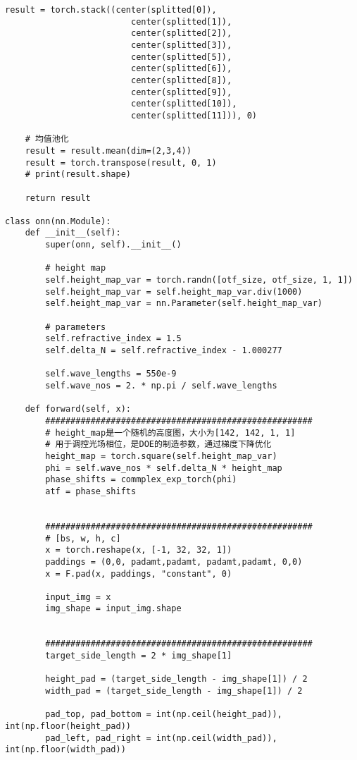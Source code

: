 \begin{lstlisting}[style=Python]
    result = torch.stack((center(splitted[0]),
                         center(splitted[1]),
                         center(splitted[2]),
                         center(splitted[3]),
                         center(splitted[5]),
                         center(splitted[6]),
                         center(splitted[8]),
                         center(splitted[9]),
                         center(splitted[10]),
                         center(splitted[11])), 0)
    
    # 均值池化
    result = result.mean(dim=(2,3,4))
    result = torch.transpose(result, 0, 1)
    # print(result.shape)
    
    return result

class onn(nn.Module):
    def __init__(self):
        super(onn, self).__init__()

        # height map
        self.height_map_var = torch.randn([otf_size, otf_size, 1, 1])
        self.height_map_var = self.height_map_var.div(1000)
        self.height_map_var = nn.Parameter(self.height_map_var)

        # parameters
        self.refractive_index = 1.5
        self.delta_N = self.refractive_index - 1.000277

        self.wave_lengths = 550e-9
        self.wave_nos = 2. * np.pi / self.wave_lengths

    def forward(self, x):
        #####################################################
        # height_map是一个随机的高度图，大小为[142, 142, 1, 1]
        # 用于调控光场相位，是DOE的制造参数，通过梯度下降优化
        height_map = torch.square(self.height_map_var)
        phi = self.wave_nos * self.delta_N * height_map
        phase_shifts = commplex_exp_torch(phi)
        atf = phase_shifts


        #####################################################
        # [bs, w, h, c]
        x = torch.reshape(x, [-1, 32, 32, 1])
        paddings = (0,0, padamt,padamt, padamt,padamt, 0,0)
        x = F.pad(x, paddings, "constant", 0)

        input_img = x
        img_shape = input_img.shape


        #####################################################
        target_side_length = 2 * img_shape[1]

        height_pad = (target_side_length - img_shape[1]) / 2
        width_pad = (target_side_length - img_shape[1]) / 2

        pad_top, pad_bottom = int(np.ceil(height_pad)), int(np.floor(height_pad))
        pad_left, pad_right = int(np.ceil(width_pad)), int(np.floor(width_pad))


\end{lstlisting}
